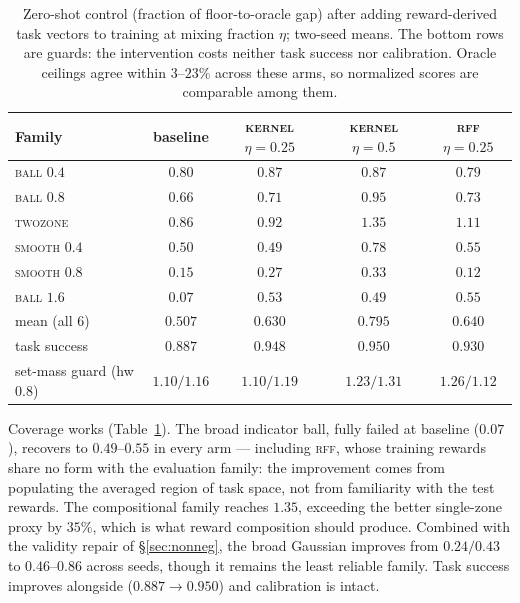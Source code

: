 \documentclass{article}
\begin{document}
\begin{table}[t]
\centering\small
\begin{tabular}{l c c c c}
\toprule
Family & baseline & \textsc{kernel} $\eta{=}0.25$ & \textsc{kernel} $\eta{=}0.5$ & \textsc{rff} $\eta{=}0.25$ \\
\midrule
\textsc{ball} $0.4$   & $0.80$ & $0.87$ & $0.87$ & $0.79$ \\
\textsc{ball} $0.8$   & $0.66$ & $0.71$ & $\mathbf{0.95}$ & $0.73$ \\
\textsc{twozone}      & $0.86$ & $0.92$ & $\mathbf{1.35}$ & $1.11$ \\
\textsc{smooth} $0.4$ & $0.50$ & $0.49$ & $\mathbf{0.78}$ & $0.55$ \\
\textsc{smooth} $0.8$ & $0.15$ & $0.27$ & $0.33$ & $0.12$ \\
\textsc{ball} $1.6$   & $0.07$ & $\mathbf{0.53}$ & $\mathbf{0.49}$ & $\mathbf{0.55}$ \\
\midrule
mean (all 6)          & $0.507$ & $0.630$ & $\mathbf{0.795}$ & $0.640$ \\
task success          & $0.887$ & $0.948$ & $0.950$ & $0.930$ \\
set-mass guard (hw $0.8$) & $1.10/1.16$ & $1.10/1.19$ & $1.23/1.31$ & $1.26/1.12$ \\
\bottomrule
\end{tabular}
\caption{Zero-shot control (fraction of floor-to-oracle gap) after adding
reward-derived task vectors to training at mixing fraction $\eta$; two-seed
means. The bottom rows are guards: the intervention costs neither task success
nor calibration. Oracle ceilings agree within $3$--$23\%$ across these arms, so
normalized scores are comparable among them.}
\label{tab:rewardz}
\end{table}

Coverage works (Table~\ref{tab:rewardz}). The broad indicator ball, fully
failed at baseline ($0.07$), recovers to $0.49$--$0.55$ in every arm ---
including \textsc{rff}, whose training rewards share no form with the
evaluation family: the improvement comes from populating the averaged region of
task space, not from familiarity with the test rewards. The compositional
family reaches $1.35$, exceeding the better single-zone proxy by $35\%$, which
is what reward composition should produce. Combined with the validity repair of
\S\ref{sec:nonneg}, the broad Gaussian improves from $0.24/0.43$ to
$0.46$--$0.86$ across seeds, though it remains the least reliable family. Task
success improves alongside ($0.887\to0.950$) and calibration is intact.
\end{document}
